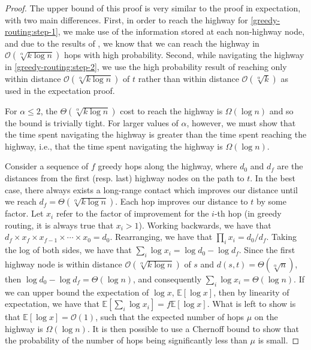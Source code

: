 \begin{proof}
    The upper bound of this proof is very similar to the proof in expectation,
    with two main differences.
    First, in order to reach the highway for \cref{greedy-routing:step-1}, we
    make use of the information stored at each non-highway node, and due to the
    results of , we know that we can reach the
    highway in $\mathcal{O}(\sqrt[\alpha]{k \log{n}})$ hops with high
    probability.
    Second, while navigating the highway in \cref{greedy-routing:step-2}, we use
    the high probability result of  reaching only
    within distance $\mathcal{O}(\sqrt[\alpha]{k \log{n}})$ of $t$ rather than
    within distance $\mathcal{O}(\sqrt[\alpha]{k})$ as used in the expectation
    proof.

    For $\alpha \leq 2$, the $\Theta(\sqrt[\alpha]{k \log{n}})$ cost to reach
    the highway is $\Omega(\log{n})$ and so the bound is trivially tight.
    For larger values of $\alpha$, however, we must show that the time spent
    navigating the highway is greater than the time spent reaching the highway,
    i.e., that the time spent navigating the highway is $\Omega(\log{n})$.

    Consider a sequence of $f$ greedy hops along the highway, where $d_0$ and $d_f$
    are the distances from the first (resp. last) highway nodes on the path to
    $t$.
    In the best case, there always exists a long-range contact which improves
    our distance until we reach $d_f = \Theta(\sqrt[\alpha]{k \log{n}})$.
    Each hop improves our distance to $t$ by some factor.
    Let $x_i$ refer to the factor of improvement for the $i$-th hop (in greedy routing, it is always true that $x_i > 1$). Working
    backwards, we have that $d_f \times x_f \times x_{f - 1} \times \cdots
    \times x_0 = d_0$.
    Rearranging, we have that $\prod_i{x_i} = d_0 / d_f$.
    Taking the log of both sides, we have that $\sum_i{\log{x_i}} =
    \log{d_0} - \log{d_f}$.
    Since the first highway node is within distance $\mathcal{O}(\sqrt[\alpha]{k
    \log{n}})$ of $s$ and $d(s, t) = \Theta(\sqrt[\alpha]{n})$, then $\log{d_0}
    - \log{d_f} = \Theta(\log{n})$, and consequently $\sum_i{\log{x_i}} =
    \Theta(\log{n})$.
    If we can upper bound the expectation of $\log{x}$, $\mathbb{E}[\log{x}]$,
    then by linearity of expectation, we have that
    $\mathbb{E}[\sum_i{\log{x_i}}] = f \mathbb{E}[\log{x}]$.
    What is left to show is that $\mathbb{E}[\log{x}] = \mathcal{O}(1)$, such
    that the expected number of hops $\mu$ on the highway is $\Omega(\log{n})$.
    It is then possible to use a Chernoff bound to show that the probability of
    the number of hops being significantly less than $\mu$ is small.


\end{proof}

